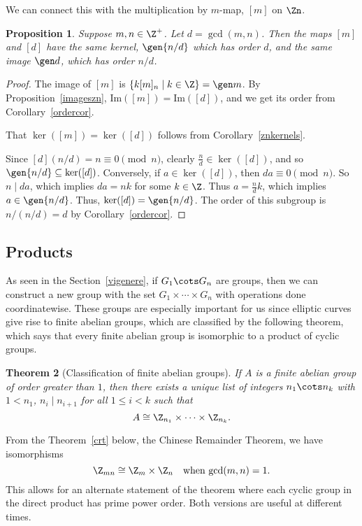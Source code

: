 \documentclass[12pt]{amsart}
\renewcommand{\Im}{\mathrm{Im}} %
\theoremstyle{plain}
\newtheorem{thm}{Theorem}[section]
\newtheorem{prop}[thm]{Proposition}
\theoremstyle{definition}
\theoremstyle{remark}
\begin{document}
We can connect this with the multiplication by $m$-map, $[m]$ on
$\Zn$.
\begin{prop}
  Suppose $m,n\in\Z^+$.  Let $d=\gcd(m,n)$.  Then the maps $[m]$ and
  $[d]$ have the same kernel, $\gen{n/d}$ which has order $d$, and the
  same image $\gen d$, which has order $n/d$.
\end{prop}
\begin{proof}
  The image of $[m]$ is $\{k[m]_n\mid k\in\Z\}=\gen m$.  By
  Proposition~\ref{imageszn}, $\Im([m])=\Im([d])$, and we get its
  order from Corollary~\ref{ordercor}.

  That $\ker([m])=\ker([d])$ follows from Corollary~\ref{znkernels}.
  
  Since $[d](n/d)=n\equiv 0\pmod n$, clearly $\frac n d \in
  \ker([d])$, and so $\gen{n/d}\subseteq \ker([d])$.  Conversely, if
  $a\in\ker([d])$, then $da\equiv 0\pmod n$.  So $n\mid da$, which
  implies $da=nk$ for some $k\in\Z$.  Thus $a=\frac n d k$, which
  implies $a\in\gen{n/d}$.  Thus, $\ker([d])=\gen{n/d}$.  The order of
  this subgroup is $n/(n/d)=d$ by Corollary~\ref{ordercor}.
\end{proof}

\subsection{Products}

As seen in the Section~\ref{vigenere}, if $G_1\cots G_n$ are groups,
then we can construct a new group with the set $G_1\times\cdots\times G_n$ with
operations done coordinatewise.  These groups are especially important
for us since elliptic curves give rise to finite abelian groups, which
are classified by the following theorem, which says that every finite
abelian group is isomorphic to a product of cyclic groups.
\begin{thm}[Classification of finite abelian groups]
\label{finiteabelian}
  If $A$ is a finite abelian group of order greater than $1$, then
  there exists a unique list of integers $n_1\cots n_k$ with $1<n_1$,
  $n_i\mid n_{i+1}$ for all $1\leq i<k$ such that 
  \[ A \cong \Z_{n_1}\times\cdots\times \Z_{n_k}.\]
\end{thm}
From the Theorem~\ref{crt} below, the Chinese Remainder Theorem, we
have isomorphisms
\[ \Z_{mn} \cong \Z_m\times \Z_n \quad\text{when $\gcd(m,n)=1$}.\]
This allows for an alternate statement of the theorem where each
cyclic group in the direct product has prime power order.  Both
versions are useful at different times.
\end{document}
